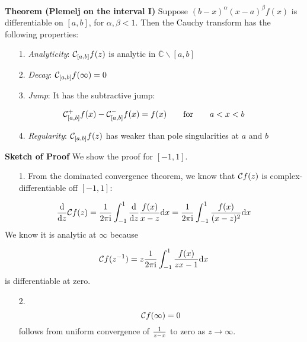 \documentclass[12pt,landscape]{article}
\def\qqfor{\qquad\hbox{for}\qquad}
\def\D{ {\rm d} }
\def\I{ {\rm i} }
\def\C{ {\mathbb C} }
\def\CC{ {\cal C} }
\def\dx{\D x}
\begin{document}
{\textbf{Theorem (Plemelj on the interval I)} Suppose $(b-x)^\alpha (x-a)^\beta f(x)$ is differentiable  on $[a,b]$, for $\alpha, \beta < 1$. Then the Cauchy transform has the following properties:

\begin{itemize}
\item[1. ] \emph{Analyticity}: $\CC_{[a,b]} f(z)$ is analytic in $\bar \C \backslash [a,b]$


\item[2. ] \emph{Decay}: $\CC_{[a,b]} f(\infty) = 0$


\item[3. ] \emph{Jump}: It has the subtractive jump:

\end{itemize}
\[
\CC_{[a,b]}^+ f(x) - \CC_{[a,b]}^- f(x) = f(x) \qqfor a < x < b
\]
\begin{itemize}
\item[4. ] \emph{Regularity}: $\CC_{[a,b]} f(z)$ has weaker than pole singularities at $a$ and $b$

\end{itemize}
\newpage
\textbf{Sketch of Proof} We show the proof for $[-1,1]$.

\begin{itemize}
\item[1. ] From the dominated convergence theorem, we know that $\CC f(z)$ is complex-differentiable off $[-1,1]$:

\end{itemize}
\[
{\D \over \D z} {\cal C} f(z) = {1 \over 2 \pi \I}\int_{-1}^1  {\D \over \D z} {f(x) \over x - z} \dx = {1 \over 2 \pi \I}\int_{-1}^1   {f(x) \over (x - z)^2} \dx
\]
We know it is analytic at $\infty$ because

\[
{\cal C} f(z^{-1}) = z {1 \over 2 \pi \I}\int_{-1}^1   {f(x) \over z x - 1} \dx
\]
is differentiable at zero.

\begin{itemize}
\item[2. ] \[
{\cal C} f(\infty) = 0
\]
follows from uniform convergence of $1 \over z - x$ to zero as $z \rightarrow \infty$.

\newpage


\end{itemize}}
\end{document}
